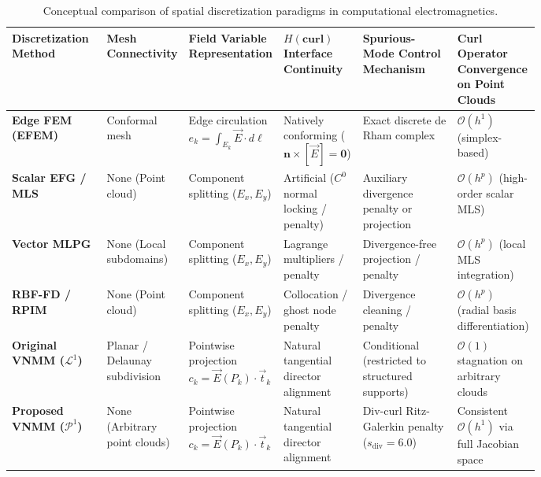 \documentclass[preprint,12pt]{elsarticle}
\begin{document}
\begin{table}[!htbp]
\centering
\small
\setlength{\tabcolsep}{4pt}
\caption{Conceptual comparison of spatial discretization paradigms in computational electromagnetics.}
\label{tab:meshless_comparison}
\begin{tabularx}{\linewidth}{@{}
>{\raggedright\arraybackslash}p{0.18\linewidth}
>{\centering\arraybackslash}p{0.12\linewidth}
>{\centering\arraybackslash}p{0.15\linewidth}
>{\centering\arraybackslash}p{0.15\linewidth}
>{\centering\arraybackslash}p{0.18\linewidth}
>{\centering\arraybackslash}X
@{}}
\toprule
\textbf{Discretization Method} & 
\textbf{Mesh Connectivity} & 
\textbf{Field Variable Representation} & 
\textbf{$H(\mathbf{curl})$ Interface Continuity} & 
\textbf{Spurious-Mode Control Mechanism} & 
\textbf{Curl Operator Convergence on Point Clouds} \\
\midrule
\textbf{Edge FEM (EFEM)} \cite{nedelec1980mixed, monk2003finite} & 
Conformal mesh & 
Edge circulation $e_k = \int_{E_k} \vec{E} \cdot d\boldsymbol{\ell}$ & 
Natively conforming ($\mathbf{n} \times [\vec{E}] = \mathbf{0}$) & 
Exact discrete de Rham complex & 
$\mathcal{O}(h^1)$ (simplex-based) \\
\addlinespace
\textbf{Scalar EFG / MLS} \cite{belytschko1994element, cingoski1998element} & 
None (Point cloud) & 
Component splitting ($E_x, E_y$) & 
Artificial ($C^0$ normal locking / penalty) & 
Auxiliary divergence penalty or projection & 
$\mathcal{O}(h^p)$ (high-order scalar MLS) \\
\addlinespace
\textbf{Vector MLPG} \cite{atluri2002meshless, nicomedes2012meshless} & 
None (Local subdomains) & 
Component splitting ($E_x, E_y$) & 
Lagrange multipliers / penalty & 
Divergence-free projection / penalty & 
$\mathcal{O}(h^p)$ (local MLS integration) \\
\addlinespace
\textbf{RBF-FD / RPIM} \cite{liu2005introduction, slak2018refined} & 
None (Point cloud) & 
Component splitting ($E_x, E_y$) & 
Collocation / ghost node penalty & 
Divergence cleaning / penalty & 
$\mathcal{O}(h^p)$ (radial basis differentiation) \\
\addlinespace
\textbf{Original VNMM ($\mathcal{L}^1$)} \cite{ortiz2021nodal, ortiz2023tese} & 
Planar / Delaunay subdivision & 
Pointwise projection $c_k = \vec{E}(P_k) \cdot \vec{t}_k$ & 
Natural tangential director alignment & 
Conditional (restricted to structured supports) & 
$\mathcal{O}(1)$ stagnation on arbitrary clouds \\
\addlinespace
\textbf{Proposed VNMM ($\mathcal{P}^1$)} & 
None (Arbitrary point clouds) & 
Pointwise projection $c_k = \vec{E}(P_k) \cdot \vec{t}_k$ & 
Natural tangential director alignment & 
Div-curl Ritz-Galerkin penalty ($s_{\mathrm{div}} = 6.0$) & 
Consistent $\mathcal{O}(h^1)$ via full Jacobian space \\
\bottomrule
\end{tabularx}
\end{table}
\end{document}
